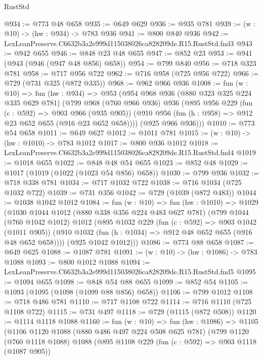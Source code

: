\begin{lexlean}{RustStd}
\begin{coremodule}
@934 := @773 @48 @658
@935 := @649 @629
@936 := @935 @781
@939 := (w : @10) -> (hw : @934) -> @783 @936
@941 := @800 @840 @936
@942 := LexLeanPreserve.C6632b3a2e999d115038026ca828209de.R15.RustStd.fnd3
@943 := @942 @655
@946 := @848 @23 @48 @655
@947 := @852 @23
@953 := @941 (@943 (@946 (@947 @48 @856) @658))
@954 := @799 @840
@956 := @718 @323 @781
@958 := @717 @956 @722
@962 := @716 @958 (@725 @956 @722)
@966 := @729 (@731 @325 (@872 @335))
@968 := @962 @966 @936
@1008 := fun (w : @10) =>
  fun (hw : @934) =>
  @953
    (@954
      @968
      @936
      (@880 @323 @325 @224 @335 @629 @781)
      (@799
        @968
        (@760 @966 @936)
        @936
        (@895
          @956
          @229
          (fun (c : @592) => @903 @966 (@935 @905))
          (@910 @956 (fun (h : @958) => @912 @23 @652 @655 (@916 @23 @652 @658))))
        (@925 @966 @936)))
@1010 := @773 @54 @658
@1011 := @649 @627
@1012 := @1011 @781
@1015 := (w : @10) -> (hw : @1010) -> @783 @1012
@1017 := @800 @936 @1012
@1018 := LexLeanPreserve.C6632b3a2e999d115038026ca828209de.R15.RustStd.fnd4
@1019 := @1018 @655
@1022 := @848 @48 @54 @655
@1023 := @852 @48
@1029 := @1017 (@1019 (@1022 (@1023 @54 @856) @658))
@1030 := @799 @936
@1032 := @718 @338 @781
@1034 := @717 @1032 @722
@1038 := @716 @1034 (@725 @1032 @722)
@1039 := @731 @356
@1042 := @729 (@1039 (@872 @483))
@1044 := @1038 @1042 @1012
@1084 := fun (w : @10) =>
  fun (hw : @1010) =>
  @1029
    (@1030
      @1044
      @1012
      (@880 @338 @356 @224 @483 @627 @781)
      (@799
        @1044
        (@760 @1042 @1012)
        @1012
        (@895
          @1032
          @229
          (fun (c : @592) => @903 @1042 (@1011 @905))
          (@910 @1032 (fun (h : @1034) => @912 @48 @652 @655 (@916 @48 @652 @658))))
        (@925 @1042 @1012)))
@1086 := @773 @88 @658
@1087 := @649 @625
@1088 := @1087 @781
@1091 := (w : @10) -> (hw : @1086) -> @783 @1088
@1093 := @800 @1012 @1088
@1094 := LexLeanPreserve.C6632b3a2e999d115038026ca828209de.R15.RustStd.fnd5
@1095 := @1094 @655
@1098 := @848 @54 @88 @655
@1099 := @852 @54
@1105 := @1093 (@1095 (@1098 (@1099 @88 @856) @658))
@1106 := @799 @1012
@1108 := @718 @486 @781
@1110 := @717 @1108 @722
@1114 := @716 @1110 (@725 @1108 @722)
@1115 := @731 @497
@1118 := @729 (@1115 (@872 @508))
@1120 := @1114 @1118 @1088
@1160 := fun (w : @10) =>
  fun (hw : @1086) =>
  @1105
    (@1106
      @1120
      @1088
      (@880 @486 @497 @224 @508 @625 @781)
      (@799
        @1120
        (@760 @1118 @1088)
        @1088
        (@895
          @1108
          @229
          (fun (c : @592) => @903 @1118 (@1087 @905))

\end{coremodule}
\end{lexlean}
